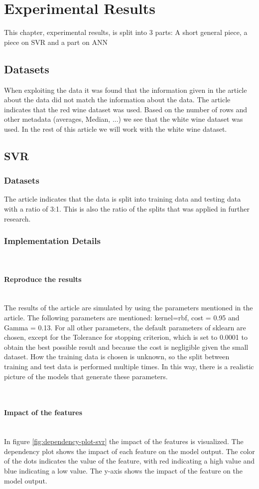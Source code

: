 \documentclass{article}
\newcommand{\subsubsubsection}[1]{%
  \paragraph{#1}\mbox{}\\}
\begin{document}
\section{Experimental Results}
This chapter, experimental results, is split into 3 parts: A short general piece, a piece on SVR and a part on ANN

\subsection{Datasets}
When exploiting the data it was found that the information given in the article about the data did not match the information about the data. The article indicates that the red wine dataset was used. Based on the number of rows and other metadata (averages, Median, ...) we see that the white wine dataset was used. In the rest of this article we will work with the white wine dataset.

\subsection{SVR}

\subsubsection{Datasets}
The article indicates that the data is split into training data and testing data with a ratio of 3:1. This is also the ratio of the splits that was applied in further research.

\subsubsection{Implementation Details}

\subsubsubsection{Reproduce the results}
The results of the article are simulated by using the parameters mentioned in the article. The following parameters are mentioned: kernel=rbf, cost = 0.95 and Gamma = 0.13. For all other parameters, the default parameters of sklearn are chosen, except for the Tolerance for stopping criterion, which is set to 0.0001 to obtain the best possible result and because the cost is negligible given the small dataset.
How the training data is chosen is unknown, so the split between training and test data is performed multiple times. In this way, there is a realistic picture of the models that generate these parameters.

\subsubsubsection{Impact of the features}
In figure \autoref{fig:dependency-plot-svr}  the impact of the features is visualized.
The dependency plot shows the impact of each feature on the model output.
The color of the dots indicates the value of the feature, with red indicating a high value and blue indicating a low value.
The y-axis shows the impact of the feature on the model output.
\end{document}
